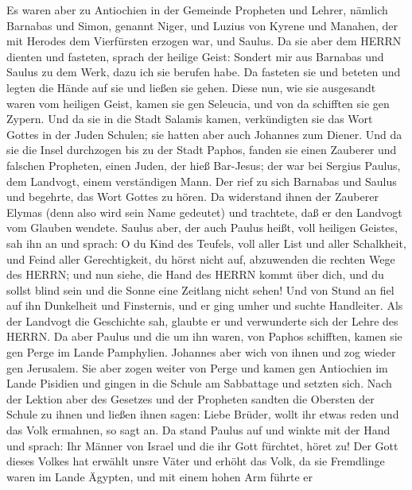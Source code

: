  Es waren aber zu Antiochien in der Gemeinde Propheten und
Lehrer, nämlich Barnabas und Simon, genannt Niger, und Luzius von Kyrene
und Manahen, der mit Herodes dem Vierfürsten erzogen war, und Saulus.
 Da sie aber dem HERRN dienten und fasteten, sprach der
heilige Geist: Sondert mir aus Barnabas und Saulus zu dem Werk, dazu ich
sie berufen habe.  Da fasteten sie und beteten und legten
die Hände auf sie und ließen sie gehen.  Diese nun, wie sie
ausgesandt waren vom heiligen Geist, kamen sie gen Seleucia, und von da
schifften sie gen Zypern.  Und da sie in die Stadt Salamis
kamen, verkündigten sie das Wort Gottes in der Juden Schulen; sie hatten
aber auch Johannes zum Diener.  Und da sie die Insel
durchzogen bis zu der Stadt Paphos, fanden sie einen Zauberer und
falschen Propheten, einen Juden, der hieß Bar-Jesus;  der
war bei Sergius Paulus, dem Landvogt, einem verständigen Mann. Der rief
zu sich Barnabas und Saulus und begehrte, das Wort Gottes zu hören.
 Da widerstand ihnen der Zauberer Elymas (denn also wird
sein Name gedeutet) und trachtete, daß er den Landvogt vom Glauben
wendete.  Saulus aber, der auch Paulus heißt, voll heiligen
Geistes, sah ihn an  und sprach: O du Kind des Teufels,
voll aller List und aller Schalkheit, und Feind aller Gerechtigkeit, du
hörst nicht auf, abzuwenden die rechten Wege des HERRN; 
und nun siehe, die Hand des HERRN kommt über dich, und du sollst blind
sein und die Sonne eine Zeitlang nicht sehen! Und von Stund an fiel auf
ihn Dunkelheit und Finsternis, und er ging umher und suchte Handleiter.
 Als der Landvogt die Geschichte sah, glaubte er und
verwunderte sich der Lehre des HERRN.  Da aber Paulus und
die um ihn waren, von Paphos schifften, kamen sie gen Perge im Lande
Pamphylien. Johannes aber wich von ihnen und zog wieder gen Jerusalem.
 Sie aber zogen weiter von Perge und kamen gen Antiochien
im Lande Pisidien und gingen in die Schule am Sabbattage und setzten
sich.  Nach der Lektion aber des Gesetzes und der Propheten
sandten die Obersten der Schule zu ihnen und ließen ihnen sagen: Liebe
Brüder, wollt ihr etwas reden und das Volk ermahnen, so sagt an.
 Da stand Paulus auf und winkte mit der Hand und sprach:
Ihr Männer von Israel und die ihr Gott fürchtet, höret zu! 
Der Gott dieses Volkes hat erwählt unsre Väter und erhöht das Volk, da
sie Fremdlinge waren im Lande Ägypten, und mit einem hohen Arm führte er
